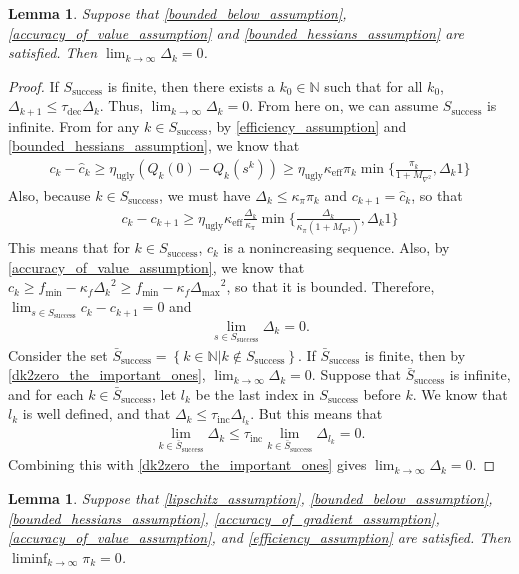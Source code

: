 \documentclass{article}
\newtheorem{lemma}[theorem]{Lemma}
\theoremstyle{case}
\newcommand{\naturals}{{\mathbb N}}
\newcommand{\qk}{{Q_k}}
\newcommand{\ck}{{c_k}}
\newcommand{\dk}{{\Delta_k}}
\newcommand{\pik}{{\pi_k}}
\newcommand{\sk}{{s^k}}
\newcommand{\fmin}{{f_{\text{min}}}}
\newcommand{\dkpo}{{\Delta_{k+1}}}
\newcommand{\ckpo}{{c_{k+1}}}
\newcommand{\ctrialk}{{\hat c_k}}
\newcommand{\kappaf}{{\kappa_{f}}}
\newcommand{\maxhes}{{M_{\nabla^2}}}
\newcommand{\kcrit}{{\kappa_{\pi}}}
\newcommand{\tinc}{{\tau_{\text{inc}}}}
\newcommand{\tdec}{{\tau_{\text{dec}}}}
\newcommand{\eugly}{{\eta_{\text{ugly}}}}
\newcommand{\success}{{S_{\text{success}}}}
\newcommand{\keff}{{\kappa_{\text{eff}}}}
\newcommand{\dmax}{{\Delta_{\text{max}}}}
\newcommand{\unsuccess}{{\bar S_{\text{success}}}}
\begin{document}
\begin{lemma}
\label{dk2zero}
Suppose that \cref{bounded_below_assumption}, \cref{accuracy_of_value_assumption} and \cref{bounded_hessians_assumption} are satisfied.
Then $\lim_{k\to\infty} \dk = 0$.
\end{lemma}
\begin{proof}
If $\success$ is finite, then there exists a $k_0 \in \naturals$ such that for all $k_0$, $\dkpo \le \tdec \dk$.
Thus, $\lim_{k\to\infty} \dk = 0$.
From here on, we can assume $\success$ is infinite.
From for any $k \in \success$, by \cref{efficiency_assumption} and \cref{bounded_hessians_assumption}, we know that
\begin{align*}
\ck - \ctrialk \ge \eugly \left(\qk(0) - \qk(\sk)\right) \ge \eugly \keff \pik \min\{\frac{\pik}{1 + \maxhes}, \dk 1\}
\end{align*}
Also, because $k \in \success$, we must have $\dk \le \kcrit \pik$ and $\ckpo = \ctrialk$, so that
\begin{align*}
\ck - \ckpo \ge \eugly \keff \frac{\dk}{\kcrit} \min\{\frac{\dk}{\kcrit\left(1 + \maxhes\right)}, \dk 1\}
\end{align*}
This means that for $k \in \success$, $\ck$ is a nonincreasing sequence.
Also, by \cref{accuracy_of_value_assumption}, we know that $\ck \ge \fmin - \kappaf\dk^2 \ge \fmin - \kappaf\dmax^2$, so that it is bounded.
Therefore, $\lim_{s \in \success} \ck - \ckpo = 0$ and 
\begin{align}
\lim_{s \in \success} \dk = 0. \label{dk2zero_the_important_ones}
\end{align}
Consider the set $\unsuccess = \left\{k \in \naturals | k \not \in \success \right\}$.
If $\unsuccess$ is finite, then by \cref{dk2zero_the_important_ones}, $\lim_{k\to\infty} \dk = 0$.
Suppose that $\unsuccess$ is infinite, and for each $k \in \unsuccess$, let $l_k$ be the last index in $\success$ before $k$.
We know that $l_k$ is well defined, and that $\dk \le \tinc \Delta_{l_k}$.
But this means that
\begin{align}
\lim_{k\in\unsuccess}\dk \le \tinc \lim_{k\in\unsuccess}\Delta_{l_k} = 0.
\end{align}
Combining this with \cref{dk2zero_the_important_ones} gives $\lim_{k\to\infty} \dk = 0$.
\end{proof}





\begin{lemma}
\label{weak_convergence}
Suppose that 
\cref{lipschitz_assumption},
\cref{bounded_below_assumption},
\cref{bounded_hessians_assumption},
\cref{accuracy_of_gradient_assumption},
\cref{accuracy_of_value_assumption},
and \cref{efficiency_assumption}
are satisfied.
Then $\liminf_{k\to\infty} \pik = 0$.
\end{lemma}
\end{document}
